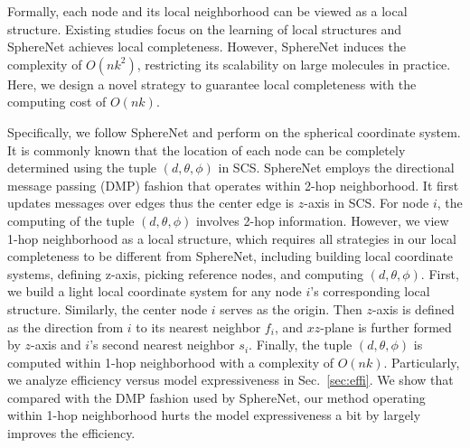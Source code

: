 \documentclass{article}
\begin{document}
Formally, each node and its local neighborhood can be viewed as a local structure.
Existing studies focus on the learning of local structures and 
SphereNet achieves local completeness.
However, SphereNet induces the complexity of $O(nk^2)$,
restricting its scalability on large molecules in practice.
Here, we design a novel strategy to guarantee local completeness
with the computing cost of $O(nk)$.

Specifically, 
we follow SphereNet and perform on the spherical coordinate system.
It is commonly known that the location of each node can be completely determined using the tuple $(d,\theta,\phi)$ in SCS.
SphereNet employs the directional message passing (DMP) fashion that operates within 2-hop neighborhood.
It first updates messages over edges thus the center edge is
$z$-axis in SCS. For node $i$, the computing of the tuple $(d,\theta,\phi)$ 
involves 2-hop information.
However, we view 1-hop neighborhood as a local structure, which requires all strategies in our local completeness to be different from SphereNet,
including building local coordinate systems, defining z-axis, picking reference nodes, and computing $(d,\theta,\phi)$.
First, we build a light local coordinate system for any node $i$'s corresponding local structure.
Similarly, the center node $i$ serves as the origin.
Then $z$-axis is defined as the direction from $i$ to its nearest neighbor $f_i$,
and $xz$-plane is further formed by $z$-axis and $i$'s second nearest neighbor $s_i$.
Finally, the tuple $(d,\theta,\phi)$ is computed within 1-hop neighborhood with a complexity of $O(nk)$.
Particularly, we analyze efficiency versus model expressiveness in Sec.~\ref{sec:effi}. We show that compared with the DMP fashion used by SphereNet,
our method operating within 1-hop neighborhood
hurts the model expressiveness a bit by largely
improves the efficiency. 
\end{document}
